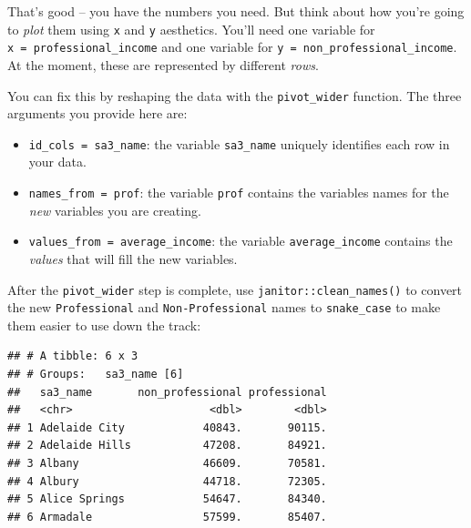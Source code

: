 \documentclass[]{book}
\newenvironment{Shaded}{\begin{snugshade}}{\end{snugshade}}
\newcommand{\CommentTok}[1]{\textcolor[rgb]{0.56,0.35,0.01}{\textit{#1}}}
\newcommand{\DataTypeTok}[1]{\textcolor[rgb]{0.13,0.29,0.53}{#1}}
\newcommand{\KeywordTok}[1]{\textcolor[rgb]{0.13,0.29,0.53}{\textbf{#1}}}
\newcommand{\NormalTok}[1]{#1}
\newcommand{\OperatorTok}[1]{\textcolor[rgb]{0.81,0.36,0.00}{\textbf{#1}}}
\newcommand{\StringTok}[1]{\textcolor[rgb]{0.31,0.60,0.02}{#1}}
\providecommand{\tightlist}{%
  \setlength{\itemsep}{0pt}\setlength{\parskip}{0pt}}
\begin{document}
That's good -- you have the numbers you need. But think about how you're going to \emph{plot} them using \texttt{x} and \texttt{y} aesthetics. You'll need one variable for \texttt{x\ =\ professional\_income} and one variable for \texttt{y\ =\ non\_professional\_income}. At the moment, these are represented by different \emph{rows}.

You can fix this by reshaping the data with the \texttt{pivot\_wider} function. The three arguments you provide here are:

\begin{itemize}
\tightlist
\item
  \texttt{id\_cols\ =\ sa3\_name}: the variable \texttt{sa3\_name} uniquely identifies each row in your data.
\item
  \texttt{names\_from\ =\ prof}: the variable \texttt{prof} contains the variables names for the \emph{new} variables you are creating.
\item
  \texttt{values\_from\ =\ average\_income}: the variable \texttt{average\_income} contains the \emph{values} that will fill the new variables.
\end{itemize}

After the \texttt{pivot\_wider} step is complete, use \texttt{janitor::clean\_names()} to convert the new \texttt{Professional} and \texttt{Non-Professional} names to \texttt{snake\_case} to make them easier to use down the track:

\begin{Shaded}
\end{Shaded}

\begin{verbatim}
## # A tibble: 6 x 3
## # Groups:   sa3_name [6]
##   sa3_name       non_professional professional
##   <chr>                     <dbl>        <dbl>
## 1 Adelaide City            40843.       90115.
## 2 Adelaide Hills           47208.       84921.
## 3 Albany                   46609.       70581.
## 4 Albury                   44718.       72305.
## 5 Alice Springs            54647.       84340.
## 6 Armadale                 57599.       85407.
\end{verbatim}
\end{document}
